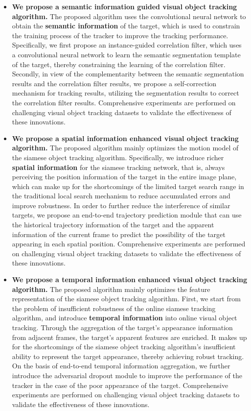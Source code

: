 \begin{itemize}
\item{\textbf{We propose a semantic information guided visual object tracking algorithm.} The proposed algorithm uses the convolutional neural network to obtain the \textbf{semantic information} of the target, which is used to constrain the training process of the tracker to improve the tracking performance. Specifically, we first propose an instance-guided correlation filter, which uses a convolutional neural network to learn the semantic segmentation template of the target, thereby constraining the learning of the correlation filter. Secondly, in view of the complementarity between the semantic segmentation results and the correlation filter results, we propose a self-correction mechanism for tracking results, utilizing the segmentation results to correct the correlation filter results. Comprehensive experiments are performed on challenging visual object tracking datasets to validate the effectiveness of these innovations.}

\item{\textbf{We propose a spatial information enhanced visual object tracking algorithm.} The proposed algorithm mainly optimizes the motion model of the siamese object tracking algorithm. Specifically, we introduce richer \textbf{spatial information} for the siamese tracking network, that is, always perceiving the position information of the target in the entire image plane, which can make up for the shortcomings of the limited target search range in the traditional local search mechanism to reduce accumulated errors and improve robustness. In order to further reduce the interference of similar targets, we propose an end-to-end trajectory prediction module that can use the historical trajectory information of the target and the apparent information of the current frame to predict the possibility of the target appearing in each spatial position. Comprehensive experiments are performed on challenging visual object tracking datasets to validate the effectiveness of these innovations.}

\item{\textbf{We propose a temporal information enhanced visual object tracking algorithm.} The proposed algorithm mainly optimizes the feature representation of the siamese object tracking algorithm. First, we start from the problem of insufficient robustness of the online siamese tracking algorithm, and introduce \textbf{temporal information} into online visual object tracking. Through the aggregation of the target's appearance information from adjacent frames, the target's apparent features are enriched. It makes up for the shortcomings of the siamese object tracking algorithm's insufficient ability to represent the target appearance, thereby achieving robust tracking. On the basis of end-to-end temporal information aggregation, we further introduce the adversarial dropout module to improve the performance of the tracker in the case of the poor appearance of the target. Comprehensive experiments are performed on challenging visual object tracking datasets to validate the effectiveness of these innovations.}


\end{itemize}
